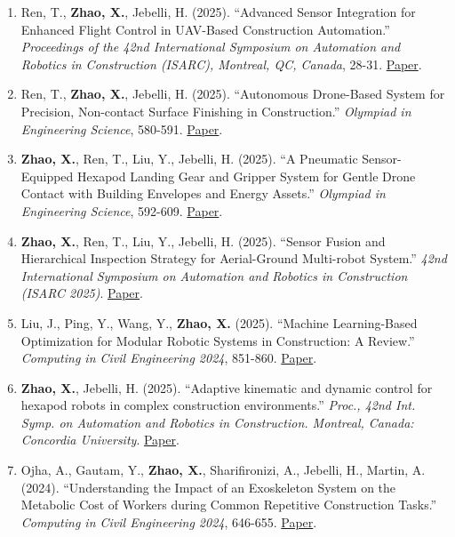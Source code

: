 \begin{enumerate}[leftmargin=1.5em, resume]
\item Ren, T., \textbf{Zhao, X.}, Jebelli, H. (2025). ``Advanced Sensor Integration for Enhanced Flight Control in UAV-Based Construction Automation.'' \textit{Proceedings of the 42nd International Symposium on Automation and Robotics in Construction (ISARC), Montreal, QC, Canada}, 28-31. \href{https://scholar.google.com/citations?view_op=view_citation&hl=en&user=a1trBDoAAAAJ&citation_for_view=a1trBDoAAAAJ:IjCSPb-OGe4C}{Paper}.
\item Ren, T., \textbf{Zhao, X.}, Jebelli, H. (2025). ``Autonomous Drone-Based System for Precision, Non-contact Surface Finishing in Construction.'' \textit{Olympiad in Engineering Science}, 580-591. \href{https://link.springer.com/chapter/10.1007/978-3-032-19744-3_41}{Paper}.
\item \textbf{Zhao, X.}, Ren, T., Liu, Y., Jebelli, H. (2025). ``A Pneumatic Sensor-Equipped Hexapod Landing Gear and Gripper System for Gentle Drone Contact with Building Envelopes and Energy Assets.'' \textit{Olympiad in Engineering Science}, 592-609. \href{https://link.springer.com/chapter/10.1007/978-3-032-19744-3_42}{Paper}.
\item \textbf{Zhao, X.}, Ren, T., Liu, Y., Jebelli, H. (2025). ``Sensor Fusion and Hierarchical Inspection Strategy for Aerial-Ground Multi-robot System.'' \textit{42nd International Symposium on Automation and Robotics in Construction (ISARC 2025)}. \href{https://scholar.google.com/citations?view_op=view_citation&hl=en&user=a1trBDoAAAAJ&citation_for_view=a1trBDoAAAAJ:5nxA0vEk-isC}{Paper}.
\item Liu, J., Ping, Y., Wang, Y., \textbf{Zhao, X.} (2025). ``Machine Learning-Based Optimization for Modular Robotic Systems in Construction: A Review.'' \textit{Computing in Civil Engineering 2024}, 851-860. \href{https://ascelibrary.org/doi/abs/10.1061/9780784486115.090}{Paper}.
\item \textbf{Zhao, X.}, Jebelli, H. (2025). ``Adaptive kinematic and dynamic control for hexapod robots in complex construction environments.'' \textit{Proc., 42nd Int. Symp. on Automation and Robotics in Construction. Montreal, Canada: Concordia University}. \href{https://scholar.google.com/citations?view_op=view_citation&hl=en&user=a1trBDoAAAAJ&citation_for_view=a1trBDoAAAAJ:zYLM7Y9cAGgC}{Paper}.
\item Ojha, A., Gautam, Y., \textbf{Zhao, X.}, Sharifironizi, A., Jebelli, H., Martin, A. (2024). ``Understanding the Impact of an Exoskeleton System on the Metabolic Cost of Workers during Common Repetitive Construction Tasks.'' \textit{Computing in Civil Engineering 2024}, 646-655. \href{https://ascelibrary.org/doi/abs/10.1061/9780784486139.070}{Paper}.

\end{enumerate}
